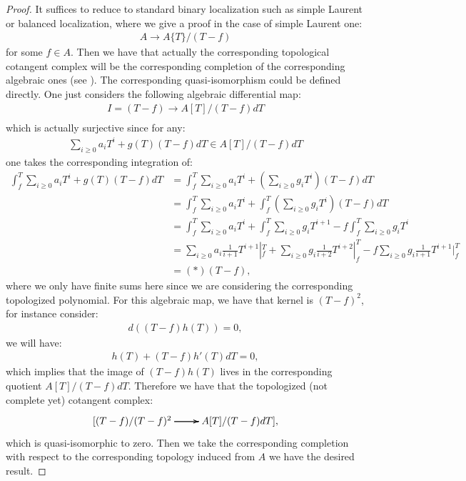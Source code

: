 \documentclass[12pt]{amsart}
\theoremstyle{definition}
\numberwithin{equation}{section}
\begin{document}
\begin{proof}
It suffices to reduce to standard binary localization such as simple Laurent or balanced localization, where we give a proof in the case of simple Laurent one:
\begin{align}
A\rightarrow A\{T\}/(T-f)	
\end{align}
for some $f\in A$. Then we have that actually the corresponding topological cotangent complex will be the corresponding completion of the corresponding algebraic ones (see \cite[Proposition 1.6.3]{Hu1}).	The corresponding quasi-isomorphism could be defined directly. One just considers the following algebraic differential map:
\begin{align}
I=(T-f) \rightarrow A[T]/(T-f) dT\\	
\end{align}
which is actually surjective since for any:
\begin{align}
\sum_{i\geq 0}a_iT^i+g(T)(T-f) dT \in A[T]/(T-f) dT	
\end{align}
one takes the corresponding integration of:
\begin{align}
\int_{f}^T	\sum_{i\geq 0}a_iT^i+g(T)(T-f) dT &= \int_{f}^T	\sum_{i\geq 0}a_iT^i+(\sum_{i\geq 0} g_iT^i) (T-f) dT\\
&= \int_{f}^T	\sum_{i\geq 0}a_iT^i+\int_{f}^T (\sum_{i\geq 0} g_iT^i)(T-f) dT \\
&= \int_{f}^T	\sum_{i\geq 0}a_iT^i+ \int_f^T \sum_{i\geq 0} g_iT^{i+1}- f\int_f^T \sum_{i\geq 0} g_iT^{i}\\
&=\sum_{i\geq 0}a_i\frac{1}{i+1}T^{i+1}|_{f}^T+\sum_{i\geq 0}g_i\frac{1}{i+2}T^{i+2}|_{f}^T-f \sum_{i\geq 0}g_i\frac{1}{i+1}T^{i+1}|_{f}^T  \\
&= (*)(T-f),
\end{align}
where we only have finite sums here since we are considering the corresponding topologized polynomial. For this algebraic map, we have that kernel is $(T-f)^2$, for instance consider:
\begin{align}
d((T-f)h(T))=0,	
\end{align}
we will have:
\begin{align}
h(T)+(T-f)h'(T)dT=0,	
\end{align}
which implies that the image of $(T-f)h(T)$ lives in the corresponding quotient $A[T]/(T-f)dT$. Therefore we have that the topologized (not complete yet) cotangent complex:
\[
\xymatrix@C+0pc@R+0pc{
[(T-f)/(T-f)^2\ar[r] \ar[r] \ar[r] &A[T]/(T-f)dT],
}
\]
which is quasi-isomorphic to zero. Then we take the corresponding completion with respect to the corresponding topology induced from $A$ we have the desired result.

\end{proof}
\end{document}
